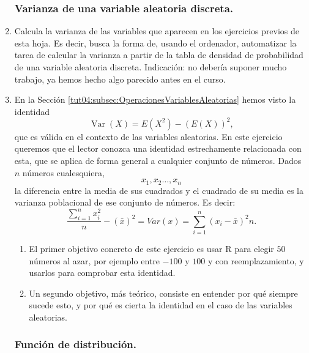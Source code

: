 \documentclass[10pt,a4paper]{article}\usepackage[]{graphicx}\usepackage[]{color}
\newcounter {cont01}
\begin{document}
\begin{enumerate}
\subsubsection*{Varianza de una variable aleatoria discreta.}

    \item Calcula la varianza de las variables que aparecen en los ejercicios previos de esta hoja. Es decir, busca la forma de, usando el ordenador, automatizar la tarea de calcular la varianza a partir de la tabla de densidad de probabilidad de una variable aleatoria discreta. Indicación: no debería suponer mucho trabajo, ya hemos hecho algo parecido antes en el curso.

    \item En la Sección \ref{tut04:subsec:OperacionesVariablesAleatorias} hemos visto la identidad
        \[\operatorname{Var}(X) = E(X^2) - \left(E(X)\right)^2,\]
        que es válida en el contexto de las variables aleatorias. En este ejercicio queremos que el lector conozca una identidad estrechamente relacionada con esta, que se aplica de forma general a cualquier conjunto de números. Dados $n$ números cualesquiera,
        \[x_1, x_2\ldots, x_n\]
        la diferencia entre la media de sus cuadrados  y el cuadrado de su media es la varianza poblacional de ese conjunto de números. Es decir:
        \[\dfrac{\sum_{i=1}^n x_i^2}{n}- (\bar x) ^2 = Var(x) = \sum_{i=1}^n{(x_i - \bar x)^2}{n}.\]
        \begin{enumerate}
          \item El primer objetivo concreto de este ejercicio es usar R para elegir $50$ números al azar, por ejemplo entre $-100$ y $100$ y con reemplazamiento, y usarlos para comprobar esta identidad.
          \item Un segundo objetivo, más teórico, consiste en entender por qué siempre sucede esto, y por qué es cierta la identidad en el caso de las variables aleatorias.
        \end{enumerate}


\subsubsection*{Función de distribución.}


\end{enumerate}
\end{document}
